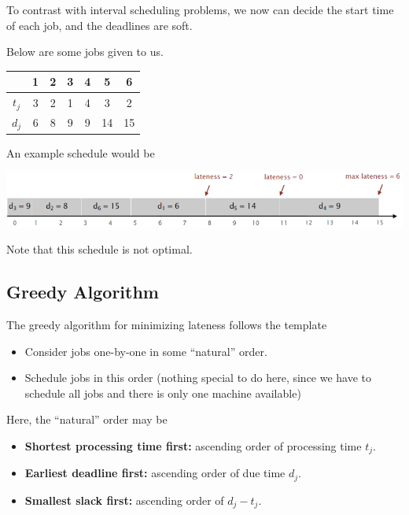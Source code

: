 To contrast with interval scheduling problems, we now can decide the start time of each job, and the deadlines are soft.

\begin{example}
    Below are some jobs given to us.

    \begin{table}[ht!]
        \centering
        \begin{tabular}{c|c|c|c|c|c|c}
                  & 1 & 2 & 3 & 4 & 5  & 6  \\ \hline
            $t_j$ & 3 & 2 & 1 & 4 & 3  & 2  \\ \hline
            $d_j$ & 6 & 8 & 9 & 9 & 14 & 15 \\
        \end{tabular}
    \end{table}

    An example schedule would be
    \begin{center}
        \includegraphics[width=0.8\linewidth]{figures/minimizing-lateness-example.png}
    \end{center}

    Note that this schedule is not optimal.
\end{example}

\subsection{Greedy Algorithm}

The greedy algorithm for minimizing lateness follows the template
\begin{itemize}
    \item Consider jobs one-by-one in some ``natural'' order.
    \item Schedule jobs in this order (nothing special to do here, since we have to schedule all jobs and there is only one machine available)
\end{itemize}

Here, the ``natural'' order may be
\begin{itemize}
    \item \textbf{Shortest processing time first:} ascending order of processing time $t_j$.
    \item \textbf{Earliest deadline first:} ascending order of due time $d_j$.
    \item \textbf{Smallest slack first:} ascending order of $d_j - t_j$.
\end{itemize}

